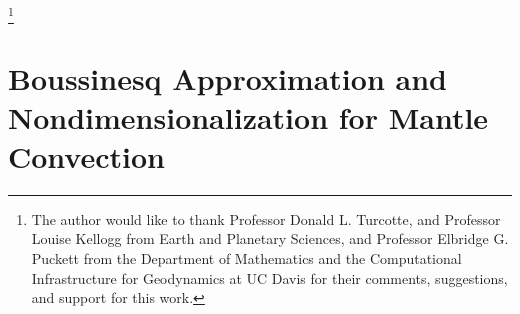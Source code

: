 \documentclass[oneside]{amsbook}
\theoremstyle{definition}
\theoremstyle{remark}
\numberwithin{section}{chapter}
\numberwithin{equation}{chapter}
\begin{document}
\thanks{The author would like to thank Professor Donald L. Turcotte, and Professor Louise Kellogg from Earth and Planetary Sciences, and Professor Elbridge G. Puckett from the Department of Mathematics and the Computational Infrastructure for Geodynamics at UC Davis for their comments, suggestions, and support for this work.}

% 

% 
% 
% 
% 
% 

\chapter{Boussinesq Approximation and Nondimensionalization for Mantle Convection}


% 
% 

\backmatter



\end{document}
